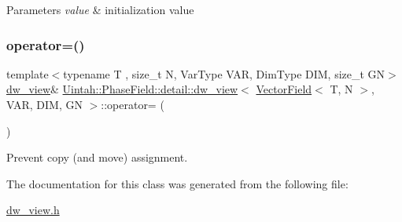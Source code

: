 \begin{DoxyParams}{Parameters}
{\em value} & initialization value \\
\hline
\end{DoxyParams}
\mbox{\label{classUintah_1_1PhaseField_1_1detail_1_1dw__view_3_01VectorField_3_01T_00_01N_01_4_00_01VAR_00_01DIM_00_01GN_01_4_ae098d4f14122168c80fc3e224f01639d}} 
\subsubsection{\texorpdfstring{operator=()}{operator=()}}
{\footnotesize\ttfamily template$<$typename T , size\+\_\+t N, Var\+Type V\+AR, Dim\+Type D\+IM, size\+\_\+t GN$>$ \\
\hyperlink{classUintah_1_1PhaseField_1_1detail_1_1dw__view}{dw\+\_\+view}\& \hyperlink{classUintah_1_1PhaseField_1_1detail_1_1dw__view}{Uintah\+::\+Phase\+Field\+::detail\+::dw\+\_\+view}$<$ \hyperlink{structUintah_1_1PhaseField_1_1VectorField}{Vector\+Field}$<$ T, N $>$, V\+AR, D\+IM, GN $>$\+::operator= (\begin{DoxyParamCaption}\item[{const \hyperlink{classUintah_1_1PhaseField_1_1detail_1_1dw__view}{dw\+\_\+view}$<$ \hyperlink{structUintah_1_1PhaseField_1_1VectorField}{Vector\+Field}$<$ T, N $>$, V\+AR, D\+IM, GN $>$ \&}]{ }\end{DoxyParamCaption})\hspace{0.3cm}{\ttfamily [delete]}}



Prevent copy (and move) assignment. 



The documentation for this class was generated from the following file\+:\begin{DoxyCompactItemize}
\item 
\hyperlink{dw__view_8h}{dw\+\_\+view.\+h}\end{DoxyCompactItemize}
